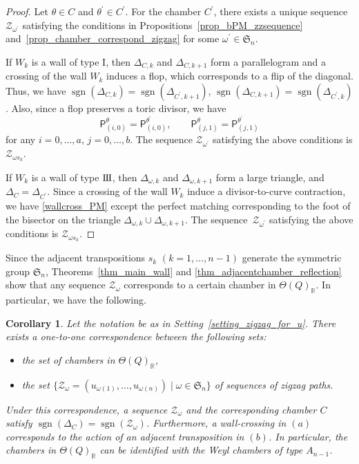 \documentclass[pdftex]{sigma}
\numberwithin{equation}{section}
\newtheorem{Corollary}[Theorem]{Corollary}
\theoremstyle{definition}
\newcommand{\RR}{\mathbb{R}}
\newcommand{\calZ}{\mathcal{Z}}
\newcommand{\fkS}{\mathfrak{S}}
\newcommand{\sfP}{\mathsf{P}}
\newcommand{\sgn}{\operatorname{sgn}}
\newcommand{\typeIII}{{\rm I\hspace{-0.7pt}I\hspace{-0.7pt}I}}
\newcommand{\permII}{\omega}
\begin{document}
\begin{proof}
Let $\theta\in C$ and $\theta^\prime\in C^\prime$.
For the chamber $C^\prime$, there exists a unique sequence $\calZ_{\permII^\prime}$
satisfying the conditions in Propositions~\ref{prop_bPM_zzsequence} and~\ref{prop_chamber_correspond_zigzag} for some $\permII^\prime\in\fkS_n$.

If $W_k$ is a wall of type I, then $\Delta_{C,k}$ and $\Delta_{C,k+1}$ form a parallelogram and a crossing of the wall $W_k$ induces a flop, which corresponds to a flip of the diagonal.
Thus, we have $\sgn(\Delta_{C,k})=\sgn(\Delta_{C^\prime,k+1})$, $\sgn(\Delta_{C,k+1})=\sgn(\Delta_{C^\prime,k})$.
Also, since a flop preserves a toric divisor, we have
\begin{equation}\label{wallcross_PM}
\sfP^\theta_{(i,0)}=\sfP^{\theta^\prime}_{(i,0)}, \qquad \sfP^\theta_{(j,1)}=\sfP^{\theta^\prime}_{(j,1)}
\end{equation}
for any $i=0, \dots, a$, $j=0, \dots, b$.
The sequence $\calZ_{\permII^\prime}$ satisfying the above conditions is $\calZ_{\permII s_k}$.

If $W_k$ is a wall of type $\typeIII$, then $\Delta_{\permII,k}$ and $\Delta_{\permII,k+1}$ form a large triangle, and $\Delta_C=\Delta_{C^\prime}$.
Since a crossing of the wall $W_k$ induce a divisor-to-curve contraction, we have \eqref{wallcross_PM}
except the perfect matching corresponding to the foot of the bisector on the triangle $\Delta_{\permII,k}\cup\Delta_{\permII,k+1}$.
The sequence~$\calZ_{\permII^\prime}$ satisfying the above conditions is $\calZ_{\permII s_k}$.
\end{proof}

Since the adjacent transpositions $s_k$ $(k=1, \dots, n-1)$ generate the symmetric group $\fkS_n$,
Theorems~\ref{thm_main_wall} and \ref{thm_adjacentchamber_reflection} show that any sequence $\calZ_\permII$ corresponds to a certain chamber in $\Theta(Q)_\RR$.
In particular, we have the following.

\begin{Corollary}
\label{cor_chamber_zigzag_correspondence}
Let the notation be as in Setting~{\rm \ref{setting_zigzag_for_u}}.
There exists a one-to-one correspondence between the following sets:
\begin{itemize}\itemsep=0pt
\item[$(a)$] the set of chambers in $\Theta(Q)_\RR$,
\item[$(b)$] the set $\big\{\calZ_\permII=(u_{\permII(1)}, \dots, u_{\permII(n)}) \mid \permII\in\fkS_n\big\}$ of sequences of zigzag paths.
\end{itemize}
Under this correspondence, a sequence $\calZ_\permII$ and the corresponding chamber $C$ satisfy $\sgn(\Delta_C)=\sgn(\calZ_\permII)$.
Furthermore, a wall-crossing in $(a)$ corresponds to the action of an adjacent transposition in $(b)$.
In particular, the chambers in $\Theta(Q)_\RR$ can be identified with the Weyl chambers of type $A_{n-1}$.
\end{Corollary}
\end{document}
